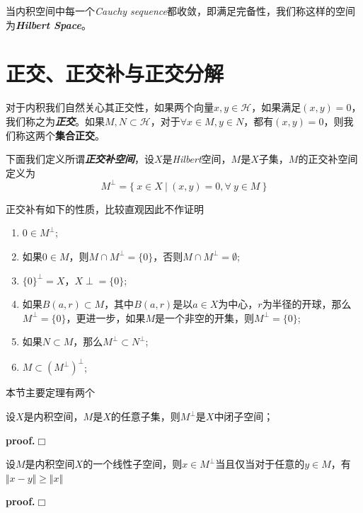 当内积空间中每一个\textsl{Cauchy sequence}都收敛，即满足完备性，我们称这样的空间为\textbf{\textsl{Hilbert Space}}。

\section{正交、正交补与正交分解}

对于内积我们自然关心其正交性，如果两个向量$x,y\in\mathcal{H}$，如果满足$(x,y)=0$，我们称之为\textbf{\textsl{正交}}。如果$M,N\subset \mathcal{H}$，对于$\forall x\in M,y\in N$，都有$(x,y)=0$，则我们称这两个\textbf{集合正交}。

下面我们定义所谓\textbf{\textsl{正交补空间}}，设$X$是\textsl{Hilbert}空间，$M$是$X$子集，$M$的正交补空间定义为
\begin{equation}
    M^{\perp}=\{\ x\in X\ |\ (x,y)=0,\forall\ y\in M\ \}
\end{equation}

正交补有如下的性质，比较直观因此不作证明
\begin{enumerate}[itemindent=2em]
    \item $0\in M^\perp$;
    \item 如果$0\in M$，则$M\cap M^\perp=\{0\}$，否则$M\cap M^\perp=\emptyset$;
    \item $\{0\}^\perp=X$，$X\perp=\{0\}$;
    \item 如果$B(a,r)\subset M$，其中$B(a,r)$是以$a\in X$为中心，$r$为半径的开球，那么$M^\perp=\{0\}$，更进一步，如果$M$是一个非空的开集，则$M^\perp=\{0\}$;
    \item 如果$N\subset M$，那么$M^\perp \subset N^\perp$;
    \item $M\subset (M^\perp)^\perp$;
\end{enumerate}

本节主要定理有两个
\begin{mdframed}
    \begin{theorem}
        设$X$是内积空间，$M$是$X$的任意子集，则$M^\perp$是$X$中闭子空间；
    \end{theorem}
\end{mdframed}
\textbf{proof.}$\Box$

\begin{mdframed}
    \begin{theorem}
        设$M$是内积空间$X$的一个线性子空间，则$x\in M^\perp$当且仅当对于任意的$y\in M$，有$\Vert x-y\Vert \geqslant \Vert x\Vert$
    \end{theorem}
\end{mdframed}
\textbf{proof.}$\Box$


